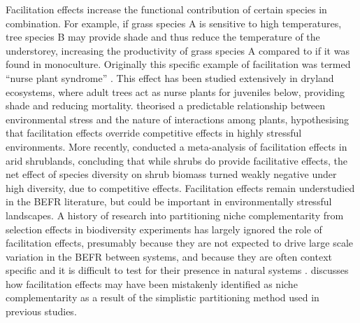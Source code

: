 \begin{refsection}
Facilitation effects increase the functional contribution of certain species in combination. For example, if grass species A is sensitive to high temperatures, tree species B may provide shade and thus reduce the temperature of the understorey, increasing the productivity of grass species A compared to if it was found in monoculture. Originally this specific example of facilitation was termed ``nurse plant syndrome'' \citep{Padilla2006}. This effect has been studied extensively in dryland ecosystems, where adult trees act as nurse plants for juveniles below, providing shade and reducing mortality. \citet{Callaway1997, Good2014, Weltzin1999} theorised a predictable relationship between environmental stress and the nature of interactions among plants, hypothesising that facilitation effects override competitive effects in highly stressful environments. More recently, \citet{Lortie2021} conducted a meta-analysis of facilitation effects in arid shrublands, concluding that while shrubs do provide facilitative effects, the net effect of species diversity on shrub biomass turned weakly negative under high diversity, due to competitive effects. Facilitation effects remain understudied in the BEFR literature, but could be important in environmentally stressful landscapes. A history of research into partitioning niche complementarity from selection effects in biodiversity experiments has largely ignored the role of facilitation effects, presumably because they are not expected to drive large scale variation in the BEFR between systems, and because they are often context specific and it is difficult to test for their presence in natural systems \citep{Wright2017}. \citet{Wright2021} discusses how facilitation effects may have been mistakenly identified as niche complementarity as a result of the simplistic partitioning method used in previous studies.


\end{refsection}
